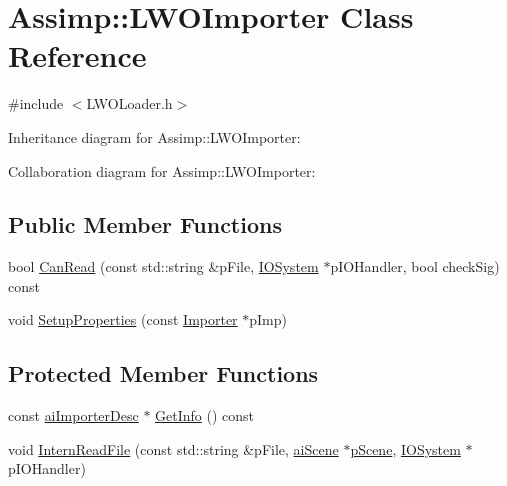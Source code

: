\hypertarget{class_assimp_1_1_l_w_o_importer}{\section{Assimp\+:\+:L\+W\+O\+Importer Class Reference}
\label{class_assimp_1_1_l_w_o_importer}
}


{\ttfamily \#include $<$L\+W\+O\+Loader.\+h$>$}



Inheritance diagram for Assimp\+:\+:L\+W\+O\+Importer\+:


Collaboration diagram for Assimp\+:\+:L\+W\+O\+Importer\+:
\subsection*{Public Member Functions}
\begin{DoxyCompactItemize}
\item 
bool \hyperlink{class_assimp_1_1_l_w_o_importer_a829d052a82d28257f6ab1f2f8b3f8e93}{Can\+Read} (const std\+::string \&p\+File, \hyperlink{class_assimp_1_1_i_o_system}{I\+O\+System} $\ast$p\+I\+O\+Handler, bool check\+Sig) const 
\item 
void \hyperlink{class_assimp_1_1_l_w_o_importer_a9c930022ee8c5d9816f4cdab0b747195}{Setup\+Properties} (const \hyperlink{class_assimp_1_1_importer}{Importer} $\ast$p\+Imp)
\end{DoxyCompactItemize}
\subsection*{Protected Member Functions}
\begin{DoxyCompactItemize}
\item 
const \hyperlink{structai_importer_desc}{ai\+Importer\+Desc} $\ast$ \hyperlink{class_assimp_1_1_l_w_o_importer_a1d3d641b69c598d1286485ea8c92fc60}{Get\+Info} () const 
\item 
void \hyperlink{class_assimp_1_1_l_w_o_importer_a4b3cb778f4d4d49620aa9a0bc44ba1e7}{Intern\+Read\+File} (const std\+::string \&p\+File, \hyperlink{structai_scene}{ai\+Scene} $\ast$\hyperlink{class_assimp_1_1_l_w_o_importer_a3d95e70dd9a82a809f3d4d97df2e6d46}{p\+Scene}, \hyperlink{class_assimp_1_1_i_o_system}{I\+O\+System} $\ast$p\+I\+O\+Handler)
\end{DoxyCompactItemize}
